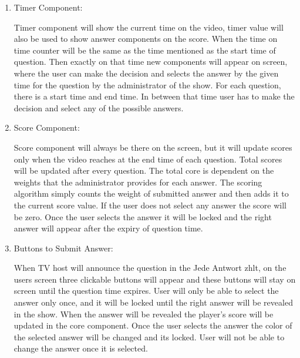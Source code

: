  \begin{enumerate}
 \item  Timer Component: 
 
 Timer component will show the current time on the video,
timer value will also be used to show answer components on
the score. When the time on time counter will be the same as
the time mentioned as the start time of question. Then exactly
on that time new components will appear on screen, where the
user can make the decision and selects the answer by the given
time for the question by the administrator of the show. For
each question, there is a start time and end time. In between
that time user has to make the decision and select any of the
possible answers.
 \item  Score Component: 
 
 Score component will always be there on the screen, but
it will update scores only when the video reaches at the end
time of each question. Total scores will be updated after every
question. The total core is dependent on the weights that the
administrator provides for each answer. The scoring algorithm
simply counts the weight of submitted answer and then adds
it to the current score value. If the user does not select any
answer the score will be zero. Once the user selects the answer
it will be locked and the right answer will appear after the
expiry of question time.
 \item  Buttons to Submit Answer:
 
 When TV host will announce the question in the Jede
Antwort zhlt, on the users screen three clickable buttons will
appear and these buttons will stay on screen until the question
time expires. User will only be able to select the answer only
once, and it will be locked until the right answer will be
revealed in the show. When the answer will be revealed the
player’s score will be updated in the core component.
Once the user selects the answer the color of the selected
answer will be changed and its locked. User will not be able
to change the answer once it is selected.
\end{enumerate}

 